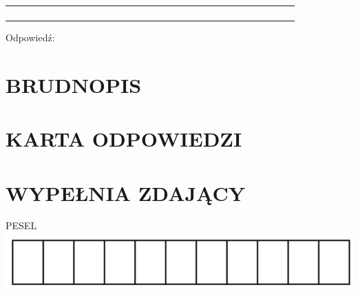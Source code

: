 \documentclass[10pt]{article}
\begin{document}
\begin{center}
\begin{tabular}{|c|c|c|c|c|c|c|c|c|c|c|c|c|c|c|c|c|c|c|c|c|c|c|c|c|c|c|c|c|c|}
\hline
 &  &  &  &  &  &  &  &  &  &  &  &  &  &  &  &  &  &  &  &  &  &  &  &  &  &  &  &  &  \\
\hline
 &  &  &  &  &  &  &  &  &  &  &  &  &  &  &  &  &  &  &  &  &  &  &  &  &  &  &  &  &  \\
\hline
 &  &  &  &  &  &  &  &  &  &  &  &  &  &  &  &  &  &  &  &  &  &  &  &  &  &  &  &  &  \\
\hline
 &  &  &  &  &  &  &  &  &  &  &  &  &  &  &  &  &  &  &  &  &  &  &  &  &  &  &  &  &  \\
\hline
 &  &  &  &  &  &  &  &  &  &  &  &  &  &  &  &  &  &  &  &  &  &  &  &  &  &  &  &  &  \\
\hline
\end{tabular}
\end{center}

Odpowiedź: \(\qquad\)

\section*{BRUDNOPIS}
\section*{KARTA ODPOWIEDZI}
\section*{WYPEŁNIA ZDAJĄCY}
PESEL\\
\includegraphics[max width=\textwidth, center]{2024_11_21_6438f6dbc3784fe6d1deg-16(1)}
\end{document}
